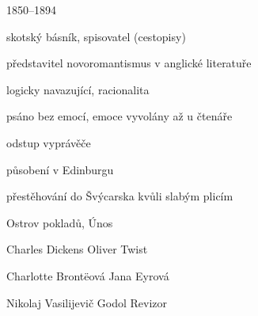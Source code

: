 {\parag{\getauthor}
\begin{compactitem}
	\item 1850--1894
	\item skotský básník, spisovatel (cestopisy)
	\item představitel novoromantismus v anglické literatuře
		\begin{compactitem}
			\item logicky navazující, racionalita
			\item psáno bez emocí, emoce vyvolány až u čtenáře
			\item odstup vyprávěče
		\end{compactitem}
	\item působení v Edinburgu
	\item přestěhování do Švýcarska kvůli slabým plicím
	\item Ostrov pokladů, Únos
\end{compactitem}

\begin{compactdesc}
		\item[Charles Dickens] Oliver Twist
		\item[Charlotte Brontëová] Jana Eyrová
		\item[Nikolaj Vasilijevič Godol] Revizor
\end{compactdesc}
}
